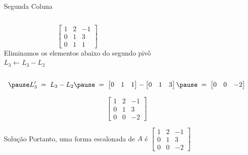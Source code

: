 \begin{resolution}{Segunda Coluna}
\begin{columns}
  \[
    \begin{bmatrix}
      1 & 2 & -1 \\
      0 & 1 & 3  \\
      0 & 1 & 1
    \end{bmatrix}
  \]
  \pause
{}
  Eliminamos os elementos abaixo do segundo pivô
  \\ \pause
  \(L_3\leftarrow L_3-L_2\)
\end{columns}
\vspace{-\baselineskip}
\[
  \pause
  L'_3
  \;=\;
  L_3 - L_2
  \pause
  \;=\;
  \begin{bmatrix}
      0 & 1 & 1
  \end{bmatrix}
  -
  \begin{bmatrix}
    0 & 1 & 3
  \end{bmatrix}
  \pause
  \;=\;
  \begin{bmatrix}
    0 & 0 & -2
  \end{bmatrix}
\]

\pause
\[
  \begin{bmatrix}
    1 & 2 & -1 \\
    0 & 1 & 3  \\
    0 & 0 & -2
  \end{bmatrix}
\]
\end{resolution}

\begin{resolution}{Solução}
Portanto, uma forma escalonada de $A$ é
\(
  \begin{bmatrix}
    1 & 2 & -1 \\
    0 & 1 & 3  \\
    0 & 0 & -2
  \end{bmatrix}
\)
\end{resolution}

